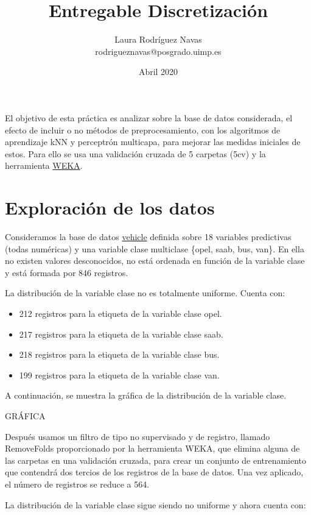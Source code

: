 \documentclass{article}
\title{Entregable Discretización}
\author{Laura Rodríguez Navas \\ rodrigueznavas@posgrado.uimp.es}
\date{Abril 2020}
\begin{document}
\maketitle

El objetivo de esta práctica es analizar sobre la base de datos considerada, el efecto de incluir o no métodos de preprocesamiento, con los algoritmos de aprendizaje kNN y perceptrón multicapa, para mejorar las medidas iniciales de estos. Para ello se usa una validación cruzada de 5 carpetas (5cv) y la herramienta \href{https://www.cs.waikato.ac.nz/ml/weka/}{WEKA}.

\section*{Exploración de los datos}

Consideramos la base de datos \href{https://github.com/renatopp/arff-datasets/blob/master/classification/vehicle.arff}{vehicle} definida sobre 18 variables predictivas (todas numéricas) y una variable clase multiclase \{opel, saab, bus, van\}. En ella no existen valores desconocidos, no está ordenada en función de la variable clase y está formada por 846 registros. 

La distribución de la variable clase no es totalmente uniforme. Cuenta con:

\begin{itemize}
	\item 212 registros para la etiqueta de la variable clase opel.
	\item 217 registros para la etiqueta de la variable clase saab.
	\item 218 registros para la etiqueta de la variable clase bus.
	\item 199 registros para la etiqueta de la variable clase van.
\end{itemize}

A continuación, se muestra la gráfica de la distribución de la variable clase.

GRÁFICA

Después usamos un filtro de tipo no supervisado y de registro, llamado RemoveFolds proporcionado por la herramienta WEKA, que elimina alguna de las carpetas en una validación cruzada, para crear un conjunto de entrenamiento que contendrá dos tercios de los registros de la base de datos. Una vez aplicado, el número de registros se reduce a 564.

La distribución de la variable clase sigue siendo no uniforme y ahora cuenta con:
\end{document}
